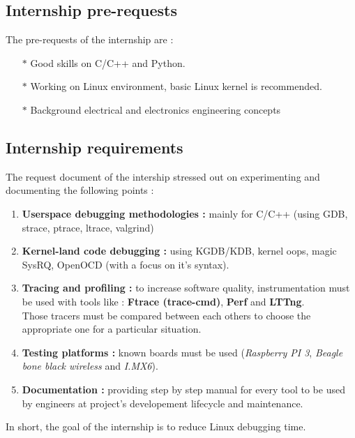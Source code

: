  
\subsection{Internship pre-requests}

The pre-requests of the internship are : 
\begin{itemize}
	\item[$\ast$] {Good skills on C/C++ and Python.}
	\item[$\ast$] {Working on Linux environment, basic Linux kernel is recommended.}
	\item[$\ast$] {Background electrical and electronics engineering concepts}
\end{itemize}


\subsection{Internship requirements}
The request document of the intership stressed out on experimenting and documenting the following points :

\begin{enumerate}
	\item \textbf{Userspace debugging methodologies : } mainly for C/C++ (using GDB, strace, ptrace, ltrace, valgrind)
	
	\item \textbf{Kernel-land code debugging : } using KGDB/KDB, kernel oops, magic SysRQ, OpenOCD (with a focus on it's syntax).
	
	\item \textbf{Tracing and profiling : } to increase software quality, instrumentation must be used with tools like : \textbf{Ftrace (trace-cmd)}, \textbf{Perf} and \textbf{LTTng}.\\
Those tracers must be compared  between each others to choose the appropriate one for a particular situation.

	\item \textbf{Testing platforms : } known boards must be used (\textit{Raspberry PI 3}, \textit{Beagle bone black wireless} and \textit{I.MX6}).
	
	\item \textbf{Documentation : } providing step by step manual for every tool to be used by engineers at project's developement lifecycle and maintenance.
\end{enumerate}


\begin{center}\Large
\color{red}In short, the goal of the internship is to reduce Linux debugging time.
\end{center}

